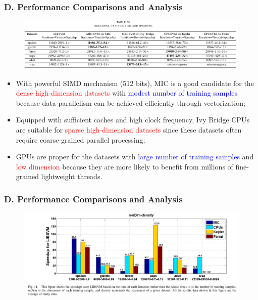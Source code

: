 \documentclass{beamer}
\begin{document}
\begin{frame}
	\frametitle{D. Performance Comparisons and Analysis}	
	\begin{figure}
		\includegraphics[width=1\textwidth]{figs/table6_performance}
	\end{figure} 
	\begin{itemize}
		\item With powerful SIMD mechanism (512 bits), MIC is
		a good candidate for the \textcolor{red}{dense high-dimension datasets} with \textcolor{blue}{modest
		number of training samples} because data parallelism can be achieved
		efficiently through vectorization; 
		\item Equipped with sufficient caches and high clock frequency, Ivy Bridge CPUs are suitable for \textcolor{red}{sparse
		high-dimension datasets} since these datasets often require coarse-grained parallel processing; 
		\item GPUs are proper for the datasets with
		\textcolor{blue}{large number of training samples} and \textcolor{red}{low dimension} because they
		are more likely to benefit from millions of fine-grained lightweight
		threads.
		
		
		
	\end{itemize}		
\end{frame}

\begin{frame}
	\frametitle{D. Performance Comparisons and Analysis}	
	\begin{figure}
		\includegraphics[width=1\textwidth]{figs/fig11_speedup}
	\end{figure} 

\end{frame}
\end{document}
